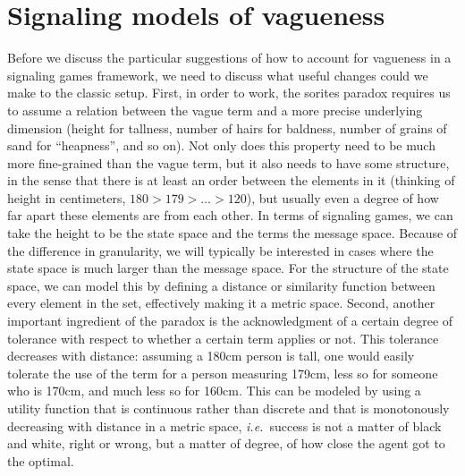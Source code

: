 \documentclass[a4paper]{article}
\begin{document}
%


\section{Signaling models of vagueness}
\label{sec:vague-signaling}

Before we discuss the particular suggestions of how to account for vagueness in a signaling games framework, we need to discuss what useful changes could we make to the classic setup.
First, in order to work, the sorites paradox requires us to assume a relation between the vague term and a more precise underlying dimension (height for tallness, number of hairs for baldness, number of grains of sand for ``heapness'', and so on).
Not only does this property need to be much more fine-grained than the vague term, but it also needs to have some structure, in the sense that there is at least an order between the elements in it (thinking of height in centimeters, $180 > 179 > \ldots > 120$), but usually even a degree of how far apart these elements are from each other.
In terms of signaling games, we can take the height to be the state space and the terms the message space.
Because of the difference in granularity, we will typically be interested in cases where the state space is much larger than the message space.
For the structure of the state space, we can model this by defining a distance or similarity function between every element in the set, effectively making it a metric space.
Second, another important ingredient of the paradox is the acknowledgment of a certain degree of tolerance with respect to whether a certain term applies or not.
This tolerance decreases with distance: assuming a 180cm person is tall, one would easily tolerate the use of the term for a person measuring 179cm, less so for someone who is 170cm, and much less so for 160cm.
This can be modeled by using a utility function that is continuous rather than discrete and that is monotonously decreasing with distance in a metric space, \emph{i.e.}~success is not a matter of black and white, right or wrong, but a matter of degree, of how close the agent got to the optimal.
\end{document}
